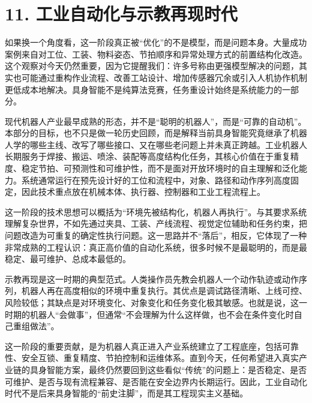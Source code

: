 

\section*{11. 工业自动化与示教再现时代}

如果换一个角度看，这一阶段真正被“优化”的不是模型，而是问题本身。大量成功案例来自对工位、工装、物料姿态、节拍顺序和异常处理方式的前置结构化改造。这个观察对今天仍然重要，因为它提醒我们：许多号称由更强模型解决的问题，其实也可能通过重构作业流程、改善工站设计、增加传感器冗余或引入人机协作机制更低成本地解决。具身智能不是纯算法竞赛，任务重设计始终是系统能力的一部分。

现代机器人产业最早成熟的形态，并不是“聪明的机器人”，而是“可靠的自动机”。本部分的目标，也不只是做一轮历史回顾，而是解释当前具身智能究竟继承了机器人学的哪些主线、改写了哪些接口、又在哪些老问题上并未真正跨越。工业机器人长期服务于焊接、搬运、喷涂、装配等高度结构化任务，其核心价值在于重复精度、稳定节拍、可预测性和可维护性，而不是面对开放环境时的自主理解和泛化能力。系统通常运行在预先设计好的工位和流程中，对象、路径和动作序列高度固定，因此技术重点放在机械本体、执行器、控制器和工业工程流程上。

这一阶段的技术思想可以概括为“环境先被结构化，机器人再执行”。与其要求系统理解复杂世界，不如先通过夹具、工装、产线流程、视觉定位辅助和任务约束，把问题改造为可重复的确定性执行问题。这一思路并不“落后”，相反，它体现了一种非常成熟的工程认识：真正高价值的自动化系统，很多时候不是最聪明的，而是最稳定、最可维护、总成本最低的。

示教再现是这一时期的典型范式。人类操作员先教会机器人一个动作轨迹或动作序列，机器人再在高度相似的环境中重复执行。其优点是调试路径清晰、上线可控、风险较低；其缺点是对环境变化、对象变化和任务变化极其敏感。也就是说，这一时期的机器人“会做事”，但通常“不会理解为什么这样做，也不会在条件变化时自己重组做法”。

这一阶段的重要贡献，是为机器人真正进入产业系统建立了工程底座，包括可靠性、安全互锁、重复精度、节拍控制和运维体系。直到今天，任何希望进入真实产业链的具身智能方案，最终仍然要回到这些看似“传统”的问题上：是否稳定、是否可维护、是否与现有流程兼容、是否能在安全边界内长期运行。因此，工业自动化时代不是后来具身智能的“前史注脚”，而是其工程现实主义基础。

